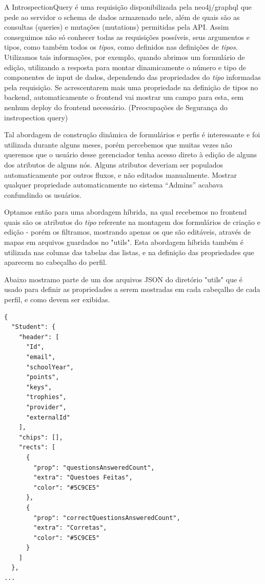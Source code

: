 A IntrospectionQuery é uma requisição disponibilizada pela neo4j/graphql que pede ao servidor o schema de dados armazenado nele, além de quais são as consultas (queries) e mutações (mutations) permitidas pela API. Assim conseguimos não só conhecer todas as requisições possíveis, seus argumentos e tipos, como também todos os \textit{tipos}, como definidos nas definições de \textit{tipos}. Utilizamos tais informações, por exemplo, quando abrimos um formulário de edição, utilizando a resposta para montar dinamicamente o número e tipo de componentes de input de dados, dependendo das propriedades do \textit{tipo} informadas pela requisição. Se acrescentarem mais uma propriedade na definição de tipos no backend, automaticamente o frontend vai mostrar um campo para esta, sem nenhum deploy do frontend necessário.
(Preocupações de Segurança do instropection query)

Tal abordagem de construção dinâmica de formulários e perfis é interessante e foi utilizada durante alguns meses, porém percebemos que muitas vezes não queremos que o usuário desse gerenciador tenha acesso direto à edição de alguns dos atributos de alguns nós. Alguns atributos deveriam ser populados automaticamente por outros fluxos, e não editados manualmente. Mostrar qualquer propriedade automaticamente no sistema ``Admins'' acabava confundindo os usuários.

Optamos então para uma abordagem híbrida, na qual recebemos no frontend quais são os atributos do \textit{tipo} referente na montagem dos formulários de criação e edição - porém os filtramos, mostrando apenas os que são editáveis, através de mapas em arquivos guardados no "utils". Esta abordagem híbrida também é utilizada nas colunas das tabelas das listas, e na definição das propriedades que aparecem no cabeçalho do perfil.

Abaixo mostramo parte de um dos arquivos JSON do diretório "utils" que é usado para definir as propriedades a serem mostradas em cada cabeçalho de cada perfil, e como devem ser exibidas.
\begin{lstlisting}
{
  "Student": {
    "header": [
      "Id",
      "email",
      "schoolYear",
      "points",
      "keys",
      "trophies",
      "provider",
      "externalId"
    ],
    "chips": [],
    "rects": [
      {
        "prop": "questionsAnsweredCount",
        "extra": "Questoes Feitas",
        "color": "#5C9CE5"
      },
      {
        "prop": "correctQuestionsAnsweredCount",
        "extra": "Corretas",
        "color": "#5C9CE5"
      }
    ]
  },
...
\end{lstlisting}

